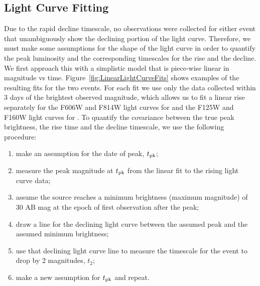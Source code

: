 \subsection{Light Curve Fitting}\label{sec:LightCurves}

Due to the rapid decline timescale, no observations were collected for
either event that unambiguously show the declining portion of the
light curve. Therefore, we must make some assumptions for the shape of
the light curve in order to quantify the peak luminosity and the
corresponding timescales for the rise and the decline.  We first
approach this with a simplistic model that is piece-wise linear in
magnitude vs time.  Figure~\ref{fig:LinearLightCurveFits} shows
examples of the resulting fits for the two events.  For each fit we
use only the data collected within 3 days of the brightest observed
magnitude, which allows us to fit a linear rise separately for the
F606W and F814W light curves for \spockone and the F125W and F160W
light curves for \spocktwo. To quantify the covariance between the
true peak brightness, the rise time and the decline timescale, we use
the following procedure:

\begin{enumerate}
\item make an assumption for the date of peak, $t_{\rm pk}$;
\item measure the peak magnitude at $t_{\rm pk}$ from the linear fit
  to the rising light curve data;
\item assume the source reaches a minimum brightness (maximum
  magnitude) of 30 AB mag at the epoch of first observation after the
  peak;
\item draw a line for the declining light curve between the assumed
  peak and the assumed minimum brightness;
\item use that declining light curve line to measure the timescale for
  the event to drop by 2 magnitudes, $t_2$;
\item make a new assumption for $t_{\rm pk}$ and repeat.
\end{enumerate}

